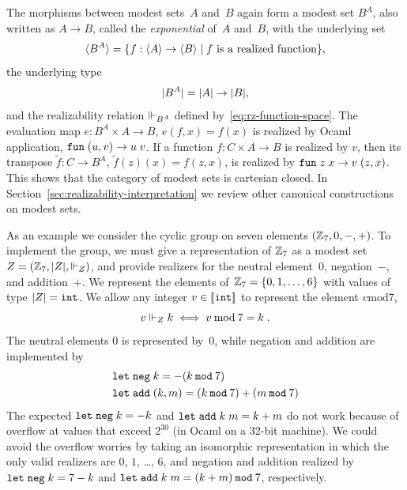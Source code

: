 The morphisms between modest sets~$A$ and~$B$ again form a modest set
$B^A$, also written as $A \to B$, called the \emph{exponential} of~$A$
and~$B$, with the underlying set
%
\begin{equation*}
  \langle B^A \rangle =
  \{f : \langle A \rangle \to \langle B \rangle \mid \text{$f$ is a realized function}\},
\end{equation*}
%
the underlying type
%
\begin{equation*}
  |B^A| = |A| \to |B|,
\end{equation*}
%
and the realizability relation $\Vdash_{B^A}$ defined
by~\eqref{eq:rz-function-space}. The evaluation map $e : B^A \times A
\to B$, $e(f,x) = f(x)$ is realized by Ocaml application,
$\mathtt{fun}\;(u,v) \to u\;v$. If a function $f : C \times A \to B$ is realized
by $v$, then its transpose $\tilde{f} : C \to B^A$, $\tilde{f}(z)(x) =
f(z,x)$, is realized by $\mathtt{fun}\;z\;x \to v \; (z,x)$. This shows that the
category of modest sets is cartesian closed. In
Section~\ref{sec:realizability-interpretation} we review other
canonical constructions on modest sets.

\bigskip

As an example we consider the cyclic group on seven elements $(\mathbb{Z}_7,
0, {-}, {+})$. To implement the group, we must give a representation
of $\mathbb{Z}_7$ as a modest set~$Z = (\mathbb{Z}_7, |Z|, {\Vdash_Z})$, and
provide realizers for the neutral element~$0$, negation~$-$, and
addition~$+$. We represent the elements of~$\mathbb{Z}_7 = \{0, 1, \ldots,
  6\}$ with values of type $|Z| = \mathtt{int}$. We allow any integer
$v \in [\![\mathtt{int}]\!]$ to represent the element $v
\mathbin{\mathrm{mod}} 7$,
%
\begin{equation*}
  v \Vdash_Z k \iff v \mathbin{\mathrm{mod}} 7 = k \;.
\end{equation*}
%
The neutral elements $0$ is represented by~$0$, while negation and
addition are implemented by
%
\begin{align*}
  &\mathtt{let}\;\mathtt{neg}\; k = -(k \mathbin{\mathtt{mod}} 7) \\
  &\mathtt{let}\;\mathtt{add}\; (k, m) = (k \mathbin{\mathtt{mod}} 7) + (m \mathbin{\mathtt{mod}} 7)
\end{align*}
%
The expected $\mathtt{let}\;\mathtt{neg}\; k = -k$ and $\mathtt{let}\;\mathtt{add}\;
  k\; m = k+m$ do not work because of overflow at values that exceed
$2^{30}$ (in Ocaml on a 32-bit machine). We could avoid the overflow
worries by taking an isomorphic representation in which the only valid
realizers are $0$, $1$, \ldots, $6$, and negation and addition
realized by $\mathtt{let}\;\mathtt{neg}\; k = 7 - k$ and $\mathtt{let}\;\mathtt{add}\;
  k\; m = (k + m) \mathbin{\mathtt{mod}} 7$, respectively.

